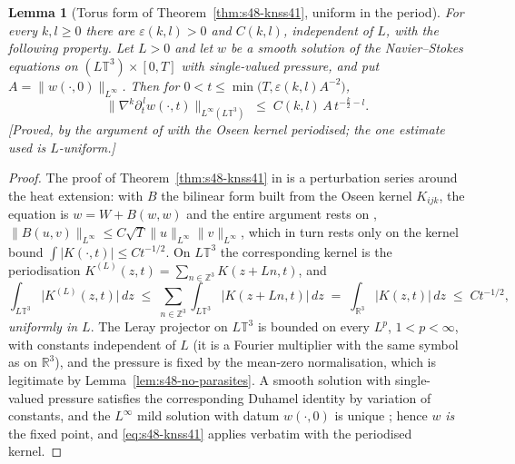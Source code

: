 \documentclass[11pt]{article}
\newtheorem{lemma}[theorem]{Lemma}
\theoremstyle{definition}
\theoremstyle{remark}
\newcommand{\R}{\mathbb{R}}
\newcommand{\Z}{\mathbb{Z}}
\newcommand{\T}{\mathbb{T}}
\begin{document}
\begin{lemma}[Torus form of Theorem~\ref{thm:s48-knss41}, uniform in the
  period]\label{lem:s48-torus-knss}
  For every $k,l\geq0$ there are $\varepsilon(k,l)>0$ and $C(k,l)$,
  independent of $L$, with the following property. Let $L>0$ and let $w$ be a
  smooth solution of the Navier--Stokes equations on
  $(L\T^3)\times[0,T]$ with single-valued pressure, and put
  $A=\|w(\cdot,0)\|_{L^\infty}$. Then for
  $0<t\leq\min\bigl(T,\varepsilon(k,l)A^{-2}\bigr)$,
  \[
    \bigl\|\nabla^k\partial_t^{\,l}w(\cdot,t)\bigr\|_{L^\infty(L\T^3)}
    \;\leq\; C(k,l)\,A\,t^{-\frac{k}{2}-l}.
  \]
  \emph{[Proved, by the argument of \cite[\S4]{KNSS2009} with the Oseen
  kernel periodised; the one estimate used is $L$-uniform.]}
\end{lemma}
\begin{proof}
  The proof of Theorem~\ref{thm:s48-knss41} in \cite{KNSS2009} is a
  perturbation series around the heat extension: with $B$ the bilinear form
  built from the Oseen kernel $K_{ijk}$, the equation is $w=W+B(w,w)$ and the
  entire argument rests on \cite[(4.5)]{KNSS2009},
  $\|B(u,v)\|_{L^\infty}\leq C\sqrt{T}\|u\|_{L^\infty}\|v\|_{L^\infty}$,
  which in turn rests only on the kernel bound
  $\int|K(\cdot,t)|\leq Ct^{-1/2}$. On $L\T^3$ the corresponding kernel is
  the periodisation $K^{(L)}(z,t)=\sum_{n\in\Z^3}K(z+Ln,t)$, and
  \[
    \int_{L\T^3}\bigl|K^{(L)}(z,t)\bigr|\,dz
    \;\leq\; \sum_{n\in\Z^3}\int_{L\T^3}|K(z+Ln,t)|\,dz
    \;=\;\int_{\R^3}|K(z,t)|\,dz \;\leq\; Ct^{-1/2},
  \]
  \emph{uniformly in $L$}. The Leray projector on $L\T^3$ is bounded on every
  $L^p$, $1<p<\infty$, with constants independent of $L$ (it is a Fourier
  multiplier with the same symbol as on $\R^3$), and the pressure is fixed by
  the mean-zero normalisation, which is legitimate by
  Lemma~\ref{lem:s48-no-parasites}. A smooth solution with single-valued
  pressure satisfies the corresponding Duhamel identity by variation of
  constants, and the $L^\infty$ mild solution with datum $w(\cdot,0)$ is
  unique \cite[\S3]{KNSS2009}; hence $w$ \emph{is} the fixed point, and
  \eqref{eq:s48-knss41} applies verbatim with the periodised kernel.
\end{proof}
\end{document}
